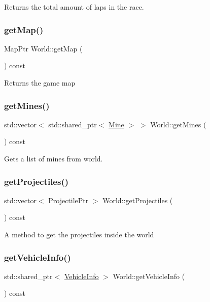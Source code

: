 Returns the total amount of laps in the race. \hypertarget{classWorld_a37b996591688a176897dc8157cdbb18d}{}\label{classWorld_a37b996591688a176897dc8157cdbb18d} 
\subsubsection{\texorpdfstring{get\+Map()}{getMap()}}
{\footnotesize\ttfamily Map\+Ptr World\+::get\+Map (\begin{DoxyParamCaption}{ }\end{DoxyParamCaption}) const}

Returns the game map \hypertarget{classWorld_a0003fd04b63a37ae393879083f2db673}{}\label{classWorld_a0003fd04b63a37ae393879083f2db673} 
\subsubsection{\texorpdfstring{get\+Mines()}{getMines()}}
{\footnotesize\ttfamily std\+::vector$<$ std\+::shared\+\_\+ptr$<$ \hyperlink{classMine}{Mine} $>$ $>$ World\+::get\+Mines (\begin{DoxyParamCaption}{ }\end{DoxyParamCaption}) const}

Gets a list of mines from world. \hypertarget{classWorld_a52e57fb3229773869172a71d49b29783}{}\label{classWorld_a52e57fb3229773869172a71d49b29783} 
\subsubsection{\texorpdfstring{get\+Projectiles()}{getProjectiles()}}
{\footnotesize\ttfamily std\+::vector$<$ Projectile\+Ptr $>$ World\+::get\+Projectiles (\begin{DoxyParamCaption}{ }\end{DoxyParamCaption}) const}

A method to get the projectiles inside the world \hypertarget{classWorld_a74d8300035e9495d954e5f6ef90b64b5}{}\label{classWorld_a74d8300035e9495d954e5f6ef90b64b5} 
\subsubsection{\texorpdfstring{get\+Vehicle\+Info()}{getVehicleInfo()}}
{\footnotesize\ttfamily std\+::shared\+\_\+ptr$<$ \hyperlink{structVehicleInfo}{Vehicle\+Info} $>$ World\+::get\+Vehicle\+Info (\begin{DoxyParamCaption}{ }\end{DoxyParamCaption}) const}

